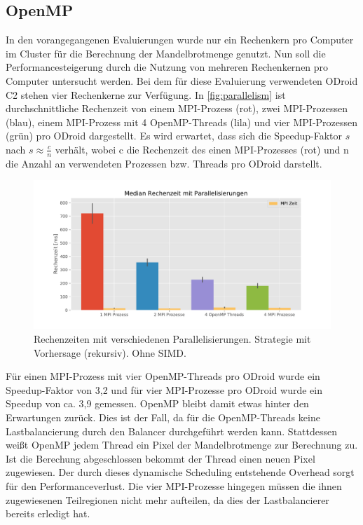 \subsection{OpenMP}
In den vorangegangenen Evaluierungen wurde nur ein Rechenkern pro Computer im Cluster für die Berechnung der Mandelbrotmenge genutzt. 
Nun soll die Performancesteigerung durch die Nutzung von mehreren Rechenkernen pro Computer 
untersucht werden. Bei dem für diese Evaluierung verwendeten ODroid C2 stehen vier Rechenkerne zur Verfügung.
In \autoref{fig:parallelism} ist durchschnittliche Rechenzeit von einem MPI-Prozess (rot), zwei MPI-Prozessen (blau), einem MPI-Prozess 
mit 4 OpenMP-Threads (lila) und vier MPI-Prozessen (grün) pro ODroid dargestellt. 
Es wird erwartet, dass sich die Speedup-Faktor \( s \) nach \( s \approx \frac{c}{n} \) verhält, 
wobei c die Rechenzeit des einen MPI-Prozesses (rot) und n die Anzahl an verwendeten Prozessen bzw. 
Threads pro ODroid darstellt.
\begin{figure}[h!]
	\centering
	\includegraphics[width=0.9\linewidth]{img/Evaluation/parallelism.pdf}
	\caption{Rechenzeiten mit verschiedenen Parallelisierungen. Strategie mit Vorhersage (rekursiv). Ohne SIMD.}
	\label{fig:parallelism}
\end{figure}

Für einen MPI-Prozess mit vier OpenMP-Threads pro ODroid wurde ein Speedup-Faktor von 3,2 und für vier MPI-Prozesse 
pro ODroid wurde ein Speedup von ca. 3,9 gemessen. 
OpenMP bleibt damit etwas hinter den Erwartungen zurück. 
Dies ist der Fall, da für die OpenMP-Threads keine Lastbalancierung durch den Balancer durchgeführt werden kann. 
Stattdessen weißt OpenMP jedem Thread ein Pixel der Mandelbrotmenge zur Berechnung zu. 
Ist die Berechung abgeschlossen bekommt der Thread einen neuen Pixel zugewiesen. 
Der durch dieses dynamische Scheduling entstehende Overhead sorgt für den Performanceverlust. 
Die vier MPI-Prozesse hingegen müssen die ihnen zugewiesenen Teilregionen nicht mehr aufteilen, 
da dies der Lastbalancierer bereits erledigt hat.


